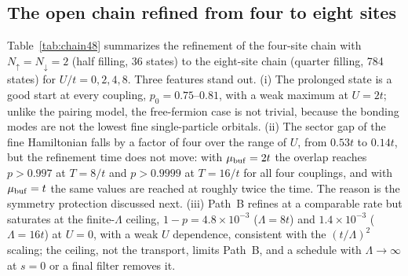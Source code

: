 \documentclass[
  aps,
  prc,
  reprint,
  superscriptaddress,
  floatfix,
  nofootinbib
]{revtex4-2}
\begin{document}
\subsection{The open chain refined from four to eight sites}
\label{sec:chain48}
Table~\ref{tab:chain48} summarizes the refinement of the four-site chain
with $N_\uparrow=N_\downarrow=2$ (half filling, 36 states) to the eight-site
chain (quarter filling, 784 states) for $U/t=0,2,4,8$.  Three features stand
out.  (i) The prolonged state is a good start at every coupling,
$p_0=0.75$--$0.81$, with a weak maximum at $U=2t$; unlike the pairing
model, the free-fermion case is not trivial, because the bonding modes are
not the lowest fine single-particle orbitals.  (ii) The sector gap of the
fine Hamiltonian falls by a factor of four over the range of $U$, from
$0.53t$ to $0.14t$, but the refinement time does not move: with
$\mu_{\rm buf}=2t$ the overlap reaches $p>0.997$ at $T=8/t$ and
$p>0.9999$ at $T=16/t$ for all four couplings, and with $\mu_{\rm buf}=t$
the same values are reached at roughly twice the time.  The reason is the
symmetry protection discussed next.  (iii) Path~B refines at a comparable
rate but saturates at the finite-$\Lambda$ ceiling,
$1-p=4.8\times10^{-3}$ ($\Lambda=8t$) and $1.4\times10^{-3}$ ($\Lambda=16t$)
at $U=0$, with a weak $U$ dependence, consistent with the $(t/\Lambda)^2$
scaling; the ceiling, not the transport, limits Path~B, and a schedule with
$\Lambda\to\infty$ at $s=0$ or a final filter removes it.
\end{document}
